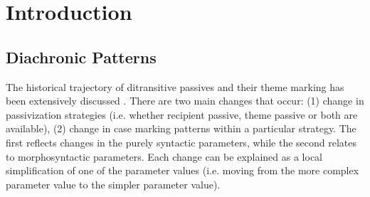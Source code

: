 %
%
%
%
%
%
%
%
%
%
%
%
%
%
%
%
%
%

\chapter{Introduction}
\label{ch:introduction}

\section{Diachronic Patterns}\label{sec:History}
The historical trajectory of ditransitive passives and their theme marking has been extensively discussed \citep{Allen.1999,Falk.1997,Platzack.2005,Arnadottir.2013}. There are two main changes that occur: (1) change in passivization strategies (i.e. whether recipient passive, theme passive or both are available), (2) change in case marking patterns within a particular strategy. The first reflects changes in the purely syntactic parameters, while the second relates to morphosyntactic parameters. Each change can be explained as a local simplification of one of the parameter values (i.e. moving from the more complex parameter value to the simpler parameter value). 

